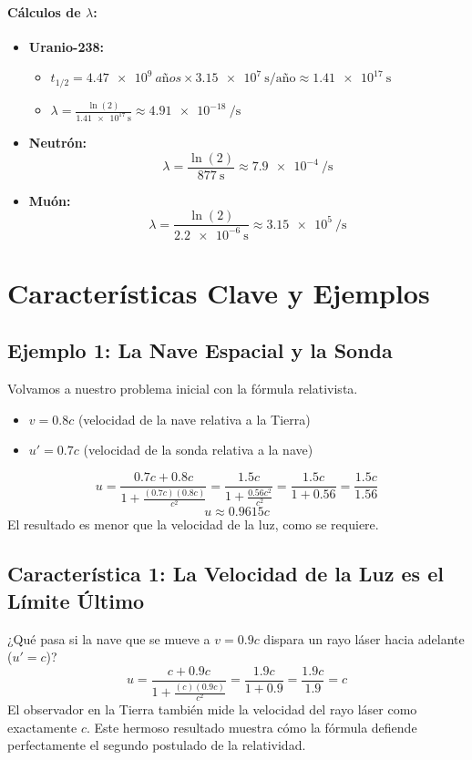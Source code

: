\documentclass[11pt,a4paper]{article}
\begin{document}
\paragraph{Cálculos de $\lambda$:}
\begin{itemize}
    \item \textbf{Uranio-238:}
    \begin{itemize}
        \item $t_{1/2} = \SI{4.47e9}{años} \times \SI{3.15e7}{\second\per\text{año}} \approx \SI{1.41e17}{\second}$
        \item $\lambda = \frac{\ln(2)}{\SI{1.41e17}{\second}} \approx \SI{4.91e-18}{\per\second}$
    \end{itemize}
    \item \textbf{Neutrón:}
    \[ \lambda = \frac{\ln(2)}{\SI{877}{\second}} \approx \SI{7.9e-4}{\per\second} \]
    \item \textbf{Muón:}
    \[ \lambda = \frac{\ln(2)}{\SI{2.2e-6}{\second}} \approx \SI{3.15e5}{\per\second} \]
\end{itemize}


\section{Características Clave y Ejemplos}

\subsection{Ejemplo 1: La Nave Espacial y la Sonda}
Volvamos a nuestro problema inicial con la fórmula relativista.
\begin{itemize}
    \item $v = 0.8c$ (velocidad de la nave relativa a la Tierra)
    \item $u' = 0.7c$ (velocidad de la sonda relativa a la nave)
\end{itemize}
\[ u = \frac{0.7c + 0.8c}{1 + \frac{(0.7c)(0.8c)}{c^2}} = \frac{1.5c}{1 + \frac{0.56c^2}{c^2}} = \frac{1.5c}{1 + 0.56} = \frac{1.5c}{1.56} \]
\[ u \approx 0.9615c \]
El resultado es menor que la velocidad de la luz, como se requiere.

\subsection{Característica 1: La Velocidad de la Luz es el Límite Último}
¿Qué pasa si la nave que se mueve a $v=0.9c$ dispara un rayo láser hacia adelante ($u'=c$)?
\[ u = \frac{c + 0.9c}{1 + \frac{(c)(0.9c)}{c^2}} = \frac{1.9c}{1 + 0.9} = \frac{1.9c}{1.9} = c \]
El observador en la Tierra también mide la velocidad del rayo láser como exactamente $c$. Este hermoso resultado muestra cómo la fórmula defiende perfectamente el segundo postulado de la relatividad. 
\end{document}
